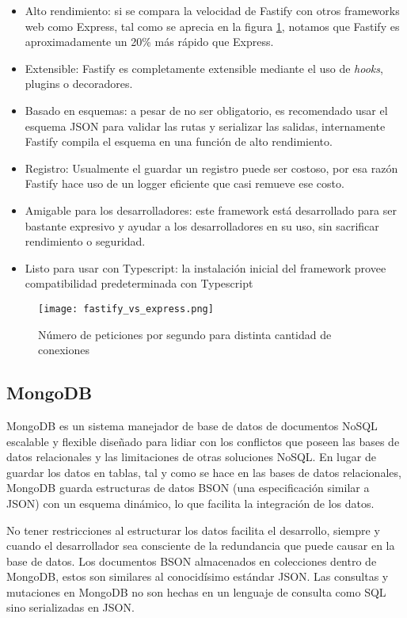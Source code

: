 \begin{itemize}
    \item Alto rendimiento: si se compara la velocidad de Fastify con otros frameworks web como Express, tal como se aprecia en la figura \ref{fig:fastify_vs_express}, notamos que Fastify es aproximadamente un 20\% más rápido que Express.
    \item Extensible: Fastify es completamente extensible mediante el uso de \textit{hooks}, plugins o decoradores.
    \item Basado en esquemas: a pesar de no ser obligatorio, es recomendado usar el esquema JSON para validar las rutas y serializar las salidas, internamente Fastify compila el esquema en una función de alto rendimiento.
    \item Registro: Usualmente el guardar un registro puede ser costoso, por esa razón Fastify hace uso de un logger eficiente que casi remueve ese costo.
    \item Amigable para los desarrolladores: este framework está desarrollado para ser bastante expresivo y ayudar a los desarrolladores en su uso, sin sacrificar rendimiento o seguridad.
    \item Listo para usar con Typescript: la instalación inicial del framework provee compatibilidad predeterminada con Typescript
\end{itemize}


\begin{figure}[H]
    \centering
    \texttt{[image: fastify\_vs\_express.png]}
    \caption{ Número de peticiones por segundo para distinta cantidad de conexiones}
    \label{fig:fastify_vs_express}
\end{figure}

\subsection{MongoDB}

MongoDB es un sistema manejador de base de datos de documentos NoSQL escalable y flexible diseñado para lidiar con los conflictos que poseen las bases de datos relacionales y las limitaciones de otras soluciones NoSQL. En lugar de guardar los datos en tablas, tal y como se hace en las bases de datos relacionales, MongoDB guarda estructuras de datos BSON (una especificación similar a JSON) con un esquema dinámico, lo que facilita la integración de los datos.

No tener restricciones al estructurar los datos facilita el desarrollo, siempre y cuando el desarrollador sea consciente de la redundancia que puede causar en la base de datos. Los documentos BSON almacenados en colecciones dentro de MongoDB, estos son similares al conocidísimo estándar JSON. Las consultas y mutaciones en MongoDB no son hechas en un lenguaje de consulta como SQL sino serializadas en JSON.

